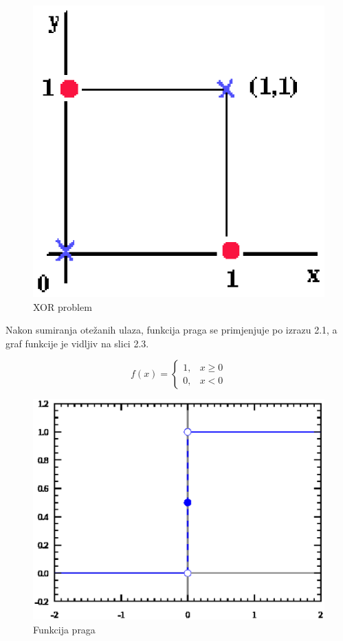 \documentclass[times, utf8, diplomski]{fer}
\begin{document}
\begin{figure}[!htbp]
    \centering
    \includegraphics{Slike/xorGraph}
    \caption{XOR problem \cite{xor}}
\end{figure}

Nakon sumiranja otežanih ulaza, funkcija praga se primjenjuje po izrazu 2.1, a graf funkcije je vidljiv na slici 2.3.

\begin{equation}
    f(x)=
    \begin{cases}
      1, & x \geq 0 \\
      0, & x < 0
    \end{cases}
\end{equation}

\pagebreak

\begin{figure}[htbp]
    \centering
    \includegraphics[scale=0.5]{Slike/step}
    \caption{Funkcija praga \cite{step}}
\end{figure}
\end{document}
